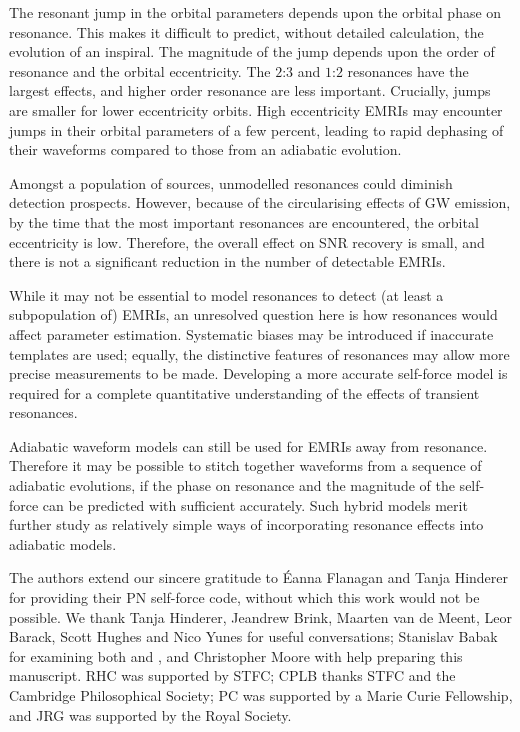 \documentclass[aps,prd,amsfonts,amssymb,amsmath,nofootinbib,showpacs,superscriptaddress,twocolumn,floatfix]{revtex4-1}
\begin{document}
The resonant jump in the orbital parameters depends upon the orbital phase on resonance. This makes it difficult to predict, without detailed calculation, the evolution of an inspiral. The magnitude of the jump depends upon the order of resonance and the orbital eccentricity. The $2$:$3$ and $1$:$2$ resonances have the largest effects, and higher order resonance are less important. Crucially, jumps are smaller for lower eccentricity orbits. High eccentricity EMRIs may encounter jumps in their orbital parameters of a few percent, leading to rapid dephasing of their waveforms compared to those from an adiabatic evolution.

Amongst a population of sources, unmodelled resonances could diminish detection prospects. However, because of the circularising effects of GW emission, by the time that the most important resonances are encountered, the orbital eccentricity is low. Therefore, the overall effect on SNR recovery is small, and there is not a significant reduction in the number of detectable EMRIs.

While it may not be essential to model resonances to detect (at least a subpopulation of) EMRIs, an unresolved question here is how resonances would affect parameter estimation. Systematic biases may be introduced if inaccurate templates are used; equally, the distinctive features of resonances may allow more precise measurements to be made. Developing a more accurate self-force model is required for a complete quantitative understanding of the effects of transient resonances.

Adiabatic waveform models can still be used for EMRIs away from resonance. Therefore it may be possible to stitch together waveforms from a sequence of adiabatic evolutions, if the phase on resonance and the magnitude of the self-force can be predicted with sufficient accurately. Such hybrid models merit further study as relatively simple ways of incorporating resonance effects into adiabatic models.


\begin{acknowledgments}
The authors extend our sincere gratitude to \'{E}anna Flanagan and Tanja Hinderer for providing their PN self-force code, without which this work would not be possible. We thank Tanja Hinderer, Jeandrew Brink, Maarten van de Meent, Leor Barack, Scott Hughes and Nico Yunes for useful conversations; Stanislav Babak for examining both \cite{BerryThesis2013} and \cite{ColeThesis2015}, and Christopher Moore with help preparing this manuscript. RHC was supported by STFC; CPLB thanks STFC and the Cambridge Philosophical Society; PC was supported by a Marie Curie Fellowship, and JRG was supported by the Royal Society.
\end{acknowledgments}
\end{document}
